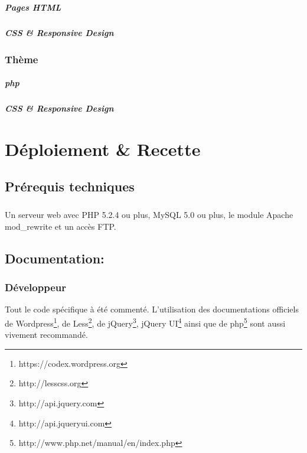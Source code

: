\documentclass[11pt,a4paper]{report}
\begin{document}
			\paragraph{Pages HTML}
			\paragraph{CSS \& Responsive Design}
		\subsection{Thème}
			\paragraph{php}
			\paragraph{CSS \& Responsive Design}

\chapter{Déploiement \& Recette}
	\section{Prérequis techniques}
		\paragraph{}Un serveur web avec PHP 5.2.4 ou plus, MySQL 5.0 ou plus, le module Apache mod\_rewrite et un accès FTP.
	\section{Documentation:}
		\subsection{Développeur}Tout le code spécifique à été commenté. L'utilisation des documentations officiels de Wordpress\footnote{https://codex.wordpress.org}, de Less\footnote{http://lesscss.org}, de jQuery\footnote{http://api.jquery.com}, jQuery UI\footnote{http://api.jqueryui.com} ainsi que de php\footnote{http://www.php.net/manual/en/index.php} sont aussi vivement recommandé.
\end{document}
